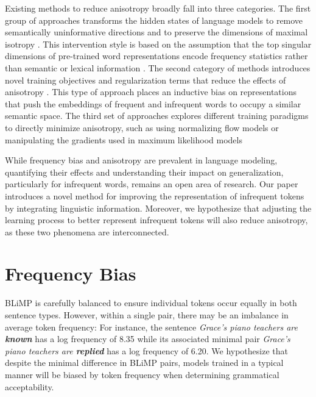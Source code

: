 Existing methods to reduce anisotropy broadly fall into three categories. The first group of approaches transforms the hidden states of language models to remove semantically uninformative directions and to preserve the dimensions of maximal isotropy \citep{arora2016simple, mu2018all, raunak2019effective, su2021whitening,bis2021too}. This intervention style is based on the assumption that the top singular dimensions of pre-trained word representations encode frequency statistics rather than semantic or lexical information \citep{mu2018all}. The second category of methods introduces novel training objectives and regularization terms that reduce the effects of anisotropy \citep{gong2018frage, gao2018representation, wang2019improving}. This type of approach places an inductive bias on representations that push the embeddings of frequent and infrequent words to occupy a similar semantic space. The third set of approaches explores different training paradigms to directly minimize anisotropy, such as using normalizing flow models \citep{li2020sentence} or manipulating the gradients used in maximum likelihood models \citep{yu2022rare}

\vspace{1em}

While frequency bias and anisotropy are prevalent in language modeling, quantifying their effects and understanding their impact on generalization, particularly for infrequent words, remains an open area of research. Our paper introduces a novel method for improving the representation of infrequent tokens by integrating linguistic information. Moreover, we hypothesize that adjusting the learning process to better represent infrequent tokens will also reduce anisotropy, as these two phenomena are interconnected.

\section{Frequency Bias}
\label{sec:freq-bias}

BLiMP is carefully balanced to ensure individual tokens occur equally in both sentence types. However, within a single pair, there may be an imbalance in average token frequency: For instance, the sentence
\textit{Grace's piano teachers are \textbf{known}} has a log frequency of 8.35 while its associated minimal pair \textit{Grace's piano teachers are \textbf{replied}} has a log frequency of 6.20.  We hypothesize that despite the minimal difference in BLiMP pairs, models trained in a typical manner will be biased by token frequency when determining grammatical acceptability.

